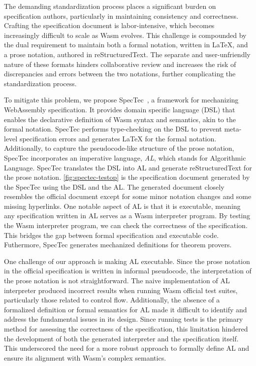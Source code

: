 The demanding standardization process places a significant burden on
specification authors, particularly in maintaining consistency and correctness.
Crafting the specification document is labor-intensive, which becomes
increasingly difficult to scale as Wasm evolves.
This challenge is compounded by the dual requirement to maintain both a formal
notation, written in LaTeX, and a prose notation, authored in reStructuredText.
The separate and user-unfriendly nature of these formats hinders collaborative
review and increases the risk of discrepancies and errors between the two
notations, further complicating the standardization process.


To mitigate this problem, we propose SpecTec~\cite{spectec}, a framework for
mechanizing WebAssembly specification.
It provides domain specific language (DSL) that enables the declarative
definition of Wasm syntax and semantics, akin to the formal notation.
SpecTec performs type-checking on the DSL to prevent meta-level specification
errors and generates LaTeX for the formal notation.
Additionally, to capture the pseudocode-like structure of the prose notation,
SpecTec incorporates an imperative language, \textit{AL}, which stands for
Algorithmic Language.
SpecTec translates the DSL into AL and generate reStructuredText for the prose
notation.
\cref{fig:spectec-testop} is the specification document generated by the
SpecTec using the DSL and the AL.
The generated document closely resembles the official document except for some
minor notation changes and some missing hyperlinks.
One notable aspect of AL is that it is executable, meaning any specification
written in AL serves as a Wasm interpreter program.
By testing the Wasm interpreter program, we can check the correctness of the
specification.
This bridges the gap between formal specification and executable code.
Futhermore, SpecTec generates mechanized definitions for theorem provers.


One challenge of our approach is making AL executable.
Since the prose notation in the official specification is written in informal
pseudocode, the interpretation of the prose notation is not straightforward.
The naive implementation of AL interpreter produced incorrect results when
running Wasm official test suites, particularly those related to control flow.
Additionally, the absence of a formalized definition or formal semantics for AL
made it difficult to identify and address the fundamental issues in its design.
Since running tests is the primary method for assessing the correctness of the
specification, this limitation hindered the development of both the generated
interpreter and the specification itself.
This underscored the need for a more robust approach to formally define AL and
ensure its alignment with Wasm's complex semantics.



